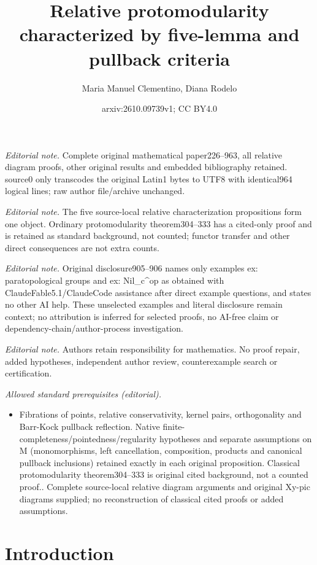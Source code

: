 \documentclass[10pt,a4paper]{amsart}
\title{Relative protomodularity characterized by five-lemma and pullback criteria}
\author{Maria Manuel Clementino, Diana Rodelo}
\date{arxiv:2610.09739v1; CC BY4.0}
\theoremstyle{plain}
\theoremstyle{definition}
\theoremstyle{remark}
\begin{document}
\maketitle
\noindent\textit{Editorial note.} Complete original mathematical paper226--963, all relative diagram proofs, other original results and embedded bibliography retained. source0 only transcodes the original Latin1 bytes to UTF8 with identical964 logical lines; raw author file/archive unchanged.\par\medskip
\noindent\textit{Editorial note.} The five source-local relative characterization propositions form one object. Ordinary protomodularity theorem304--333 has a cited-only proof and is retained as standard background, not counted; functor transfer and other direct consequences are not extra counts.\par\medskip
\noindent\textit{Editorial note.} Original disclosure905--906 names only examples ex: paratopological groups and ex: Nil\_c\textasciicircum{}op as obtained with ClaudeFable5.1/ClaudeCode assistance after direct example questions, and states no other AI help. These unselected examples and literal disclosure remain context; no attribution is inferred for selected proofs, no AI-free claim or dependency-chain/author-process investigation.\par\medskip
\noindent\textit{Editorial note.} Authors retain responsibility for mathematics. No proof repair, added hypotheses, independent author review, counterexample search or certification.\par\medskip
\noindent\textit{Allowed standard prerequisites (editorial).}\begin{itemize}
\item Fibrations of points, relative conservativity, kernel pairs, orthogonality and Barr-Kock pullback reflection. Native finite-completeness/pointedness/regularity hypotheses and separate assumptions on M (monomorphisms, left cancellation, composition, products and canonical pullback inclusions) retained exactly in each original proposition. Classical protomodularity theorem304--333 is original cited background, not a counted proof.. Complete source-local relative diagram arguments and original Xy-pic diagrams supplied; no reconstruction of classical cited proofs or added assumptions.
\end{itemize}\medskip
\section*{Introduction}
\end{document}
